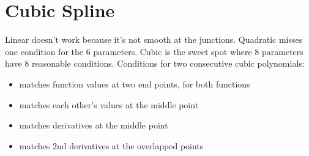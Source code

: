 \documentclass[class=article, crop=false]{standalone}
\theoremstyle{plain}
\theoremstyle{remark}
\begin{document}
\section{Cubic Spline}
Linear doesn't work because it's not smooth at the junctions.
Quadratic misses one condition for the 6 parameters.
Cubic is the sweet spot where 8 parameters have 8 reasonable conditions.
Conditions for two consecutive cubic polynomials:
\begin{itemize}
	\item matches function values at two end points, for both functions
	\item matches each other's values at the middle point 
	\item matches derivatives at the middle point
	\item matches 2nd derivatives at the overlapped points
\end{itemize}
\end{document}
